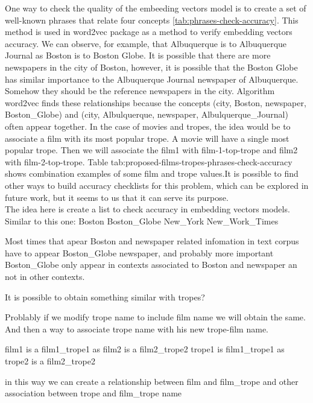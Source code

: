 \documentclass[letterpaper]{article}
\begin{document}
	 One way to check the quality of the embeeding vectors model is to create a set of 
	 well-known phrases that relate four concepts \ref{tab:phrases-check-accuracy}. This method is used in word2vec package \cite{mikolov2013} as a method to verify 
	 embedding vectors accuracy. We can observe, for example, that Albuquerque is to Albuquerque Journal
	  as Boston is to Boston Globe. It is possible that there are more newspapers in the city of Boston, however, it is possible that the Boston Globe has similar importance to the Albuquerque Journal newspaper of Albuquerque. Somehow they should be the reference newspapers in the city. Algorithm word2vec finds these relationships because the concepts (city, Boston, newspaper, Boston\_Globe) and (city, Albulquerque, newspaper, Albulquerque\_Journal) often appear together. 
	  In the case of movies and tropes, the idea would be to associate a film with its most popular trope. A movie will have a single most popular trope. 
	  Then we will associate the film1 with film-1-top-trope and film2 with film-2-top-trope. Table tab:proposed-films-tropes-phrases-check-accuracy shows combination examples of some film and trope values.It is possible to find other ways to build accuracy checklists for this problem, which can be explored in future work,
	   but it seems to us that it can serve its purpose.\\
	   
	   The idea here is create a list to check accuracy in embedding vectors models.
	   Similar to this one:
	   Boston Boston\_Globe New\_York New\_Work\_Times
	   
	   Most times that apear Boston and newspaper related infomation in text corpus have to appear Boston\_Globe newspaper, and probably more important Boston\_Globe only appear in contexts associated to Boston and newspaper an not in other contexts.
	   
	   It is possible to obtain something similar with tropes?
	   
	   Problably if we modify trope name to include film name we will obtain the same. And then a way to associate trope name with his new trope-film name.
	   
	   film1 is a film1\_trope1 as film2 is a film2\_trope2
	   trope1 is film1\_trope1 as trope2 is a film2\_trope2
	   
	   in this way we can create a relationship between film and film\_trope and other association between
	   trope and film\_trope name \\
	   
\end{document}
